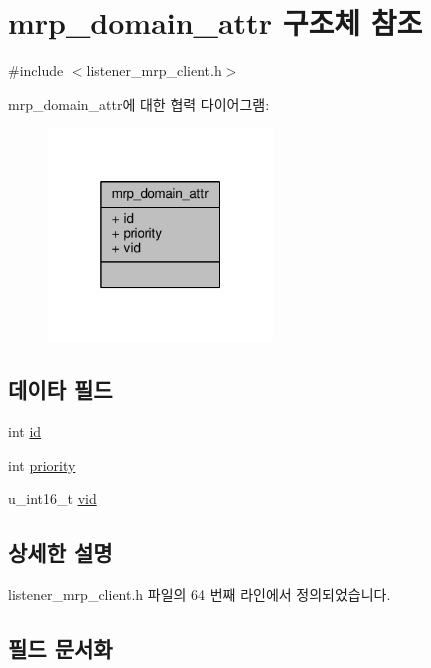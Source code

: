 \hypertarget{structmrp__domain__attr}{}\section{mrp\+\_\+domain\+\_\+attr 구조체 참조}
\label{structmrp__domain__attr}


{\ttfamily \#include $<$listener\+\_\+mrp\+\_\+client.\+h$>$}



mrp\+\_\+domain\+\_\+attr에 대한 협력 다이어그램\+:
\nopagebreak
\begin{figure}[H]
\begin{center}
\leavevmode
\includegraphics[width=169pt]{structmrp__domain__attr__coll__graph}
\end{center}
\end{figure}
\subsection*{데이타 필드}
\begin{DoxyCompactItemize}
\item 
int \hyperlink{structmrp__domain__attr_a7441ef0865bcb3db9b8064dd7375c1ea}{id}
\item 
int \hyperlink{structmrp__domain__attr_acec9ce2df15222151ad66fcb1d74eb9f}{priority}
\item 
u\+\_\+int16\+\_\+t \hyperlink{structmrp__domain__attr_a066fae47f1854479570ecc0bf7e488c3}{vid}
\end{DoxyCompactItemize}


\subsection{상세한 설명}


listener\+\_\+mrp\+\_\+client.\+h 파일의 64 번째 라인에서 정의되었습니다.



\subsection{필드 문서화}
